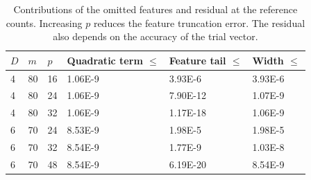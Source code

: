 \begin{table}[htbp]
\centering
\caption{Contributions of the omitted features and residual at the reference counts. Increasing $p$ reduces the feature truncation error. The residual also depends on the accuracy of the trial vector.}
\label{tab:predictor_rank_refinement}
\begin{tabular}{llllll}
\toprule
$D$ & $m$ & $p$ & Quadratic term $\leq$ & Feature tail $\leq$ & Width $\leq$ \\
\midrule
4 & 80 & 16 & 1.06E-9 & 3.93E-6 & 3.93E-6 \\
4 & 80 & 24 & 1.06E-9 & 7.90E-12 & 1.07E-9 \\
4 & 80 & 32 & 1.06E-9 & 1.17E-18 & 1.06E-9 \\
6 & 70 & 24 & 8.53E-9 & 1.98E-5 & 1.98E-5 \\
6 & 70 & 32 & 8.54E-9 & 1.77E-9 & 1.03E-8 \\
6 & 70 & 48 & 8.54E-9 & 6.19E-20 & 8.54E-9 \\
\bottomrule
\end{tabular}
\end{table}
